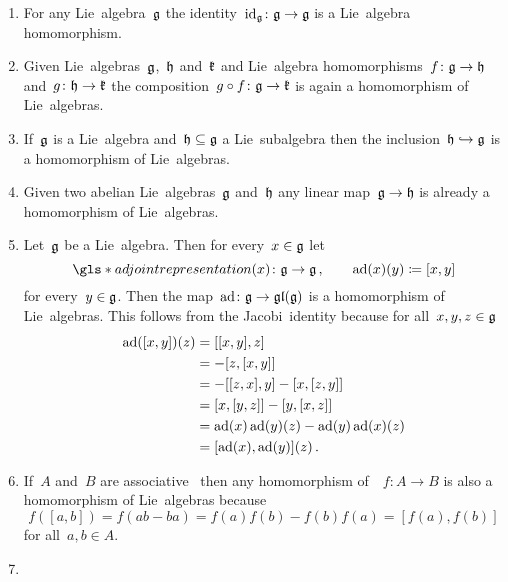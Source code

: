 \begin{examples}
  \label{homomorphisms of lie algebras}
  \leavevmode
  \begin{enumerate}
    \item
      For any Lie~algebra~$\mathfrak{g}$ the identity~$\operatorname{id}_{\mathfrak{g}} \colon \mathfrak{g} \to \mathfrak{g}$ is a Lie~algebra homomorphism.
    \item
      Given Lie~algebras~$\mathfrak{g}$,~$\mathfrak{h}$ and~$\mathfrak{k}$ and Lie~algebra homomorphisms~$f \colon \mathfrak{g} \to \mathfrak{h}$ and~$g \colon \mathfrak{h} \to \mathfrak{k}$ the composition~$g \circ f \colon \mathfrak{g} \to \mathfrak{k}$ is again a homomorphism of Lie~algebras.
    \item
      If~$\mathfrak{g}$ is a Lie~algebra and~$\mathfrak{h} \subseteq \mathfrak{g}$ a Lie~subalgebra then the inclusion~$\mathfrak{h} \hookrightarrow \mathfrak{g}$ is a homomorphism of Lie~algebras.
    \item
      Given two abelian Lie~algebras~$\mathfrak{g}$ and~$\mathfrak{h}$ any linear map~$\mathfrak{g} \to \mathfrak{h}$ is already a homomorphism of Lie~algebras.
    \item
      Let~$\mathfrak{g}$ be a Lie~algebra.
      Then for every~$x \in \mathfrak{g}$ let
      \[
        \gls*{adjoint representation}(x)
        \colon
        \glie
        \to
        \glie \,,
        \qquad
        \ad(x)(y)
        \defined
        [x,y]
      \]
      for every~$y \in \mathfrak{g}$.
      Then the map~$\operatorname{ad} \colon \mathfrak{g} \to \mathfrak{gl}(\mathfrak{g})$ is a homomorphism of Lie~algebras.
      This follows from the Jacobi~identity because for all~$x,y,z \in \mathfrak{g}$
      \begin{align*}
          \operatorname{ad}([x,y])(z)
          &=
          [[x,y], z]
          \\
          &=
          - [z, [x,y]]
          \\
          &=
          - [[z,x], y] - [x, [z,y]]
          \\
          &=
          [x, [y,z]] - [y, [x,z]]
          \\
          &=
          \operatorname{ad}(x)\operatorname{ad}(y)(z) - \operatorname{ad}(y)\operatorname{ad}(x)(z)
          \\
          &=
          [\operatorname{ad}(x), \operatorname{ad}(y)](z) \,.
      \end{align*}
    \item
    If~$A$ and~$B$ are associative~{\algebras{$\kf$}} then any homomorphism of~{\algebras{$\kf$}}~$f \colon A \to B$ is also a homomorphism of Lie~algebras because
    \[
      f([a,b])
      =
      f(ab - ba)
      =
      f(a)f(b) - f(b)f(a)
      =
      [f(a), f(b)]
    \]
    for all~$a, b \in A$.
  \item

\end{enumerate}
\end{examples}
